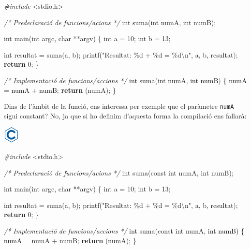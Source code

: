 \documentclass[
]{book}
\newenvironment{Shaded}{\begin{snugshade}}{\end{snugshade}}
\newcommand{\CommentTok}[1]{\textcolor[rgb]{0.56,0.35,0.01}{\textit{#1}}}
\newcommand{\ControlFlowTok}[1]{\textcolor[rgb]{0.13,0.29,0.53}{\textbf{#1}}}
\newcommand{\DataTypeTok}[1]{\textcolor[rgb]{0.13,0.29,0.53}{#1}}
\newcommand{\DecValTok}[1]{\textcolor[rgb]{0.00,0.00,0.81}{#1}}
\newcommand{\ImportTok}[1]{#1}
\newcommand{\NormalTok}[1]{#1}
\newcommand{\PreprocessorTok}[1]{\textcolor[rgb]{0.56,0.35,0.01}{\textit{#1}}}
\newcommand{\SpecialCharTok}[1]{\textcolor[rgb]{0.00,0.00,0.00}{#1}}
\newcommand{\StringTok}[1]{\textcolor[rgb]{0.31,0.60,0.02}{#1}}
\begin{document}
\begin{Shaded}
\begin{Highlighting}[]
\PreprocessorTok{\#include }\ImportTok{\textless{}stdio.h\textgreater{}}

\CommentTok{/* Predeclaració de funcions/acions */}
\DataTypeTok{int}\NormalTok{ suma(}\DataTypeTok{int}\NormalTok{ numA, }\DataTypeTok{int}\NormalTok{ numB);}

\DataTypeTok{int}\NormalTok{ main(}\DataTypeTok{int}\NormalTok{ argc, }\DataTypeTok{char}\NormalTok{ **argv) \{}
    \DataTypeTok{int}\NormalTok{ a = }\DecValTok{10}\NormalTok{;}
    \DataTypeTok{int}\NormalTok{ b = }\DecValTok{13}\NormalTok{;}

    \DataTypeTok{int}\NormalTok{ resultat = suma(a, b);}
\NormalTok{    printf(}\StringTok{"Resultat: \%d + \%d = \%d}\SpecialCharTok{\textbackslash{}n}\StringTok{"}\NormalTok{, a, b, resultat);}
    \ControlFlowTok{return} \DecValTok{0}\NormalTok{;}
\NormalTok{\}}

\CommentTok{/* Implementació de funcions/accions */}
\DataTypeTok{int}\NormalTok{ suma(}\DataTypeTok{int}\NormalTok{ numA, }\DataTypeTok{int}\NormalTok{ numB) \{}
\NormalTok{    numA = numA + numB;}
    \ControlFlowTok{return}\NormalTok{ (numA);}
\NormalTok{\}}
\end{Highlighting}
\end{Shaded}

Dins de l'àmbit de la funció, ens interessa per exemple que el paràmetre \texttt{numA} sigui constant? No, ja que si ho definim d'aquesta forma la compilació ens fallarà:

\includegraphics{./img/c.png}

\begin{Shaded}
\begin{Highlighting}[]
\PreprocessorTok{\#include }\ImportTok{\textless{}stdio.h\textgreater{}}

\CommentTok{/* Predeclaració de funcions/acions */}
\DataTypeTok{int}\NormalTok{ suma(}\DataTypeTok{const} \DataTypeTok{int}\NormalTok{ numA, }\DataTypeTok{int}\NormalTok{ numB);}

\DataTypeTok{int}\NormalTok{ main(}\DataTypeTok{int}\NormalTok{ argc, }\DataTypeTok{char}\NormalTok{ **argv) \{}
    \DataTypeTok{int}\NormalTok{ a = }\DecValTok{10}\NormalTok{;}
    \DataTypeTok{int}\NormalTok{ b = }\DecValTok{13}\NormalTok{;}

    \DataTypeTok{int}\NormalTok{ resultat = suma(a, b);}
\NormalTok{    printf(}\StringTok{"Resultat: \%d + \%d = \%d}\SpecialCharTok{\textbackslash{}n}\StringTok{"}\NormalTok{, a, b, resultat);}
    \ControlFlowTok{return} \DecValTok{0}\NormalTok{;}
\NormalTok{\}}

\CommentTok{/* Implementació de funcions/accions */}
\DataTypeTok{int}\NormalTok{ suma(}\DataTypeTok{const} \DataTypeTok{int}\NormalTok{ numA, }\DataTypeTok{int}\NormalTok{ numB) \{}
\NormalTok{    numA = numA + numB;}
    \ControlFlowTok{return}\NormalTok{ (numA);}
\NormalTok{\}}
\end{Highlighting}
\end{Shaded}
\end{document}
